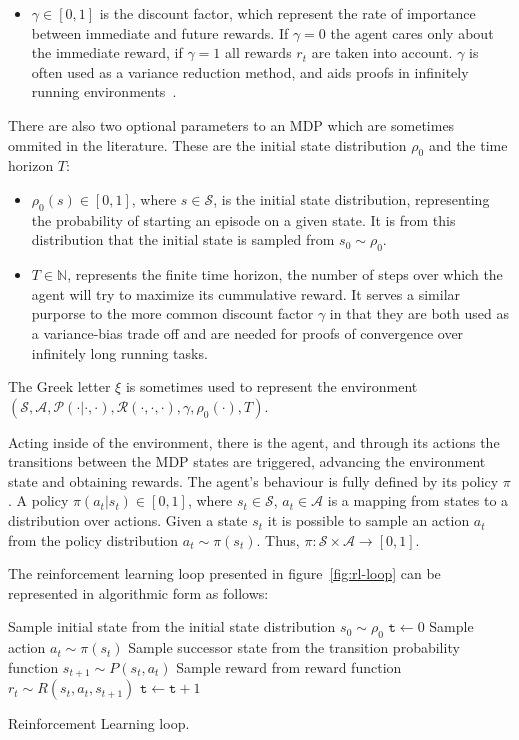\documentclass{../main.tex}{}
\newcommand{\var}{\texttt}
\begin{document}
\begin{itemize}
\item $\gamma \in [0,1]$ is the discount factor, which represent the rate of importance between immediate and future rewards. If $\gamma = 0$ the agent cares only about the immediate reward, if $\gamma = 1$ all rewards $r_t$ are taken into account. $\gamma$ is often used as a variance reduction method, and aids proofs in infinitely running environments~\citep{Sutton1999}.
\end{itemize}

There are also two optional parameters to an MDP which are sometimes ommited in the literature. These are the initial state distribution $\rho_0$ and the time horizon $T$:

\begin{itemize}
    \item $\rho_0(s) \in [0, 1]$, where $s \in \mathcal{S}$, is the initial state distribution, representing the probability of starting an episode on a given state. It is from this distribution that the initial state is sampled from $s_0 \sim \rho_0$.
    \item $T \in \mathbb{N}$, represents the finite time horizon, the number of steps over which the agent will try to maximize its cummulative reward. It serves a similar purporse to the more common discount factor $\gamma$ in that they are both used as a variance-bias trade off and are needed for proofs of convergence over infinitely long running tasks.
\end{itemize}

The Greek letter $\xi$ is sometimes used to represent the environment $(\mathcal{S}, \mathcal{A}, \mathcal{P(\cdot | \cdot, \cdot)}, \mathcal{R}(\cdot, \cdot, \cdot), \gamma, \rho_0(\cdot), T)$. 

Acting inside of the environment, there is the agent, and through its actions the transitions between the MDP states are triggered, advancing the environment state and obtaining rewards. The agent's behaviour is fully defined by its policy $\pi$. A policy $\pi(a_t | s_t) \in [0,1]$, where $s_t \in \mathcal{S}$, $a_t \in \mathcal{A}$ is a mapping from states to a distribution over actions. Given a state $s_t$ it is possible to sample an action $a_t$ from the policy distribution $a_t \sim \pi(s_t)$. Thus, $\pi: \mathcal{S} \times \mathcal{A} \to [0,1]$.

The reinforcement learning loop presented in figure~\ref{fig:rl-loop} can be represented in algorithmic form as follows:
\begin{algorithm}
    Sample initial state from the initial state distribution $s_0 \sim \rho_0$ \;
    $\var{t} \leftarrow 0$ \;
     {
        Sample action $a_t \sim \pi(s_t)$\;
        Sample successor state from the transition probability function $ s_{t+1} \sim P(s_t, a_t)$ \;
        Sample reward from reward function $r_t \sim R(s_t, a_t, s_{t+1})$ \;
        $\var{t} \leftarrow \var{t} + 1$ \;
    }
\caption{Reinforcement Learning loop.}\label{algorithm:rl-loop}
\end{algorithm}
\end{document}

